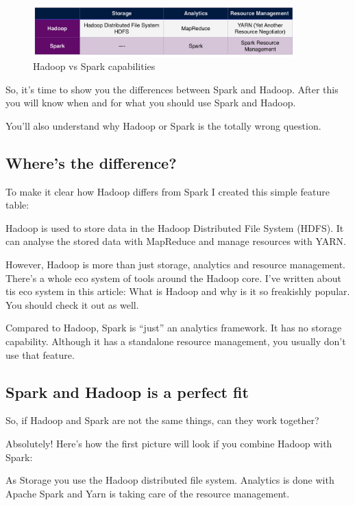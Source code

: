 \documentclass[12pt, numbers=noenddot]{scrreprt} %
\begin{document}
\begin{figure}[htbp]
  \centering
     \includegraphics[width=0.9\textwidth]{images/Table-Hadoop-and-Spark}
  \caption{Hadoop vs Spark capabilities}
  \label{fig:Bild1}
\end{figure}



So, it's time to show you the differences between Spark and Hadoop. After this you will know when and for what you should use Spark and Hadoop.

You’ll also understand why Hadoop or Spark is the totally wrong question.

\subsection{Where's the difference?}
To make it clear how Hadoop differs from Spark I created this simple feature table:


Hadoop is used to store data in the Hadoop Distributed File System (HDFS). It can analyse the stored data with MapReduce and manage resources with YARN.

However, Hadoop is more than just storage, analytics and resource management. There’s a whole eco system of tools around the Hadoop core. I’ve written about tis eco system in this article: What is Hadoop and why is it so freakishly popular. You should check it out as well.

Compared to Hadoop, Spark is “just” an analytics framework. It has no storage capability. Although it has a standalone resource management, you usually don’t use that feature.

\subsection{Spark and Hadoop is a perfect fit}
So, if Hadoop and Spark are not the same things, can they work together?

Absolutely! Here’s how the first picture will look if you combine Hadoop with Spark:


As Storage you use the Hadoop distributed file system. Analytics is done with Apache Spark and Yarn is taking care of the resource management.
\end{document}
